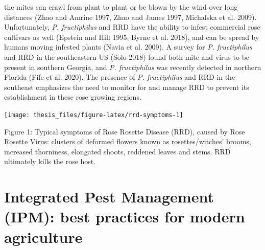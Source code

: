 \documentclass[12pt,final,CPage]{ufthesis}
\begin{document}
{the mites can crawl from plant to plant or be blown by the wind over long distances (Zhao and Amrine 1997, Zhao and James 1997, Michalska et al. 2009). Unfortunately, \emph{P. fructiphilus} and RRD have the ability to infest commercial rose cultivars as well (Epstein and Hill 1995, Byrne et al. 2018), and can be spread by humans moving infested plants (Navia et al. 2009). A survey for \emph{P. fructiphilus} and RRD in the southeastern US (Solo 2018) found both mite and virus to be present in southern Georgia, and \emph{P. fructiphilus} was recently detected in northern Florida (Fife et al. 2020).
  The presence of \emph{P. fructiphilus} and RRD in the southeast emphasizes the need to monitor for and manage RRD to prevent its establishment in these rose growing regions.
  \begin{center}\texttt{[image: thesis\_files/figure-latex/rrd-symptoms-1]} \end{center}

  Figure 1: Typical symptoms of Rose Rosette Disease (RRD), caused by Rose Rosette Virus: clusters of deformed flowers known as rosettes/witches' brooms, increased thorniness, elongated shoots, reddened leaves and stems. RRD ultimately kills the rose host.

  \hypertarget{ipm-litrev}{%
  \section{Integrated Pest Management (IPM): best practices for modern agriculture}\label{ipm-litrev}}

}
\end{document}
